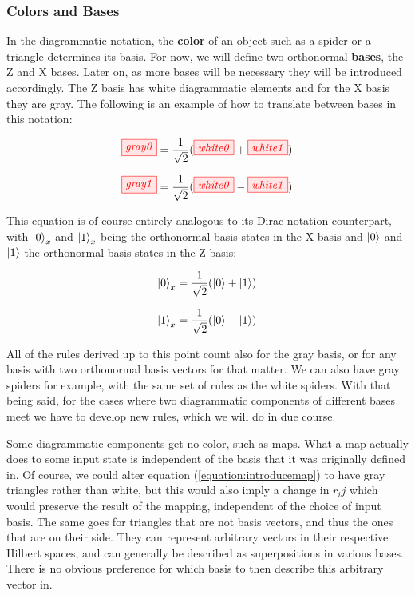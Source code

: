 \documentclass[]{article}
\begin{document}
\subsubsection{Colors and Bases}
\label{coloursandbases}

In the diagrammatic notation, the \textbf{color} of an object such as a spider or a triangle determines its basis. For now, we will define two orthonormal \textbf{bases}, the Z and X bases. Later on, as more bases will be necessary they will be introduced accordingly. The Z basis has white diagrammatic elements and for the X basis they are gray. The following is an example of how to translate between bases in this notation:

\begin{equation}
\label{equation:gray0}
\tikzfig{gray0} =\frac{1}{\sqrt{2}}( \tikzfig{white0} + \tikzfig{white1})
\end{equation}

\begin{equation}
\label{equation:gray1}
\tikzfig{gray1} =\frac{1}{\sqrt{2}}( \tikzfig{white0} - \tikzfig{white1})
\end{equation}

This equation is of course entirely analogous to its Dirac notation counterpart, with $\ket{0}_x$ and $\ket{1}_x$ being the orthonormal basis states in the X basis and $\ket{0}$ and $\ket{1}$ the orthonormal basis states in the Z basis:

\begin{equation}
\ket{0}_x = \frac{1}{\sqrt{2}}(\ket{0} + \ket{1})
\end{equation}

\begin{equation}
\ket{1}_x = \frac{1}{\sqrt{2}}(\ket{0} - \ket{1})
\end{equation}

All of the rules derived up to this point count also for the gray basis, or for any basis with two orthonormal basis vectors for that matter. We can also have gray spiders for example, with the same set of rules as the white spiders. With that being said, for the cases where two diagrammatic components of different bases meet we have to develop new rules, which we will do in due course. 

Some diagrammatic components get no color, such as maps. What a map actually does to some input state is independent of the basis that it was originally defined in. Of course, we could alter equation (\ref{equation:introducemap}) to have gray triangles rather than white, but this would also imply a change in $r_ij$ which would preserve the result of the mapping, independent of the choice of input basis. The same goes for triangles that are not basis vectors, and thus the ones that are on their side. They can represent arbitrary vectors in their respective Hilbert spaces, and can generally be described as superpositions in various bases. There is no obvious preference for which basis to then describe this arbitrary vector in.
\end{document}
